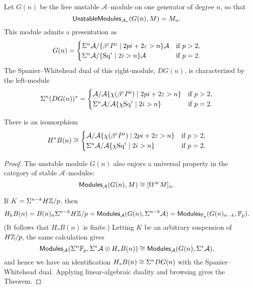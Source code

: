 \begin{definition}\label{SpanierWhiteheadDualOfGeneratingModule}
Let $G(n)$ be the free unstable $\mathcal A$--module on one generator of degree $n$, so that \[\mathsf{UnstableModules}_{\mathcal A_*}(G(n), M) = M_n.\]  This module admits a presentation as \[G(n) = \begin{cases} \Sigma^n \mathcal A / \{\beta^\varepsilon P^i \mid 2pi + 2\varepsilon > n\}\mathcal A & \text{if $p > 2$}, \\ \Sigma^n \mathcal A / \{\operatorname{Sq}^i \mid 2i > n\}\mathcal A & \text{if $p = 2$}. \end{cases}\]  The Spanier--Whitehead dual of this right-module, $DG(n)$, is characterized by the left-module \[\Sigma^n (D G(n))^* = \begin{cases}\mathcal A / \mathcal A \{\chi(\beta^\varepsilon P^i) \mid 2pi + 2\varepsilon > n\} & \text{if $p > 2$}, \\ \Sigma^n \mathcal A / \mathcal A \{\chi{\operatorname{Sq}^i} \mid 2i > n\} & \text{if $p = 2$}. \end{cases}\]
\end{definition}

\begin{theorem}
There is an isomorphism \[H^* B(n) \cong \begin{cases} \mathcal A / \mathcal A \{\chi(\beta^\varepsilon P^i) \mid 2pi + 2\varepsilon > n\} & \text{if $p > 2$}, \\ \Sigma^n \mathcal A / \mathcal A \{\chi{\operatorname{Sq}^i} \mid 2i > n\} & \text{if $p = 2$}. \end{cases}\]
\end{theorem}
\begin{proof}
The unstable module $G(n)$ also enjoys a universal property in the category of stable $\mathcal A$--modules: \[\mathsf{Modules}_{\mathcal A}(G(n), M) \cong [\Omega^\infty M]_n.\]

If $K = \Sigma^{n-k} H\mathbb Z/p$, then \[H_k B(n) = B(n)_n \Sigma^{n-k} H\mathbb Z/p = \mathsf{Modules}_{\mathcal A}(G(n), \Sigma^{n-k} \mathcal A) = \mathsf{Modules}_{\mathbb F_p}(G(n)_{n-k}, \mathbb F_p).\]  (It follows that $H_* B(n)$ is finite.)  Letting $K$ be an arbitrary suspension of $H\mathbb Z/p$, the same calculation gives \[\mathsf{Modules}_{\mathcal A}(\Sigma^n \mathbb F_p, \Sigma^* \mathcal A \otimes H_* B(n)) \cong \mathsf{Modules}_{\mathcal A}(G(n), \Sigma^* \mathcal A),\] and hence we have an identification $H_* B(n) \cong \Sigma^n DG(n)$ with the Spanier--Whitehead dual.  Applying linear-algebraic duality and browsing  gives the Theorem.
\end{proof}





